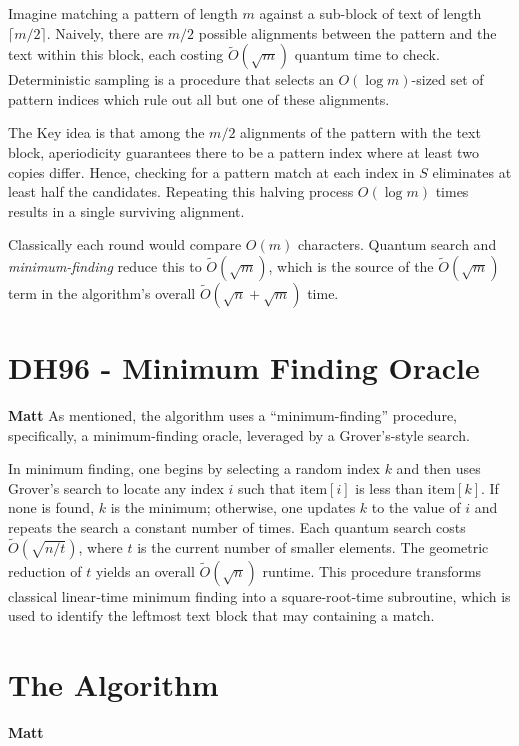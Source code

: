 \documentclass[11pt]{article}
\begin{document}
Imagine matching a pattern of length \(m\) against a sub-block of text of length \(\lceil m/2\rceil\). Naively, there are \(m/2\) possible alignments between the pattern and the text within this block, each costing \(\widetilde{O}(\sqrt{m})\) quantum time to check. Deterministic sampling is a procedure that selects an \(O(\log m)\)-sized set of pattern indices which rule out all but one of these alignments.

The Key idea is that among the \(m/2\) alignments of the pattern with the text block, aperiodicity guarantees there to be a pattern index where at least two copies differ. Hence, checking for a pattern match at each index in \(S\) eliminates at least half the candidates. Repeating this halving process \(O(\log m)\) times results in a single surviving alignment.

Classically each round would compare \(O(m)\) characters. Quantum search and \textit{minimum-finding} reduce this to \(\widetilde O(\sqrt{m})\), which is the source of the \(\widetilde O(\sqrt{m})\) term in the algorithm's overall \(\widetilde O(\sqrt{n} + \sqrt{m})\) time.


\section*{DH96 - Minimum Finding Oracle}
\textbf{Matt}\linebreak
As mentioned, the algorithm uses a ``minimum-finding'' procedure, specifically, a minimum-finding oracle, leveraged by a Grover's-style search.

In minimum finding, one begins by selecting a random index \(k\) and then uses Grover’s search to locate any index \(i\) such that \(\text{item}[i]\) is less than \(\text{item}[k]\). If none is found, \(k\) is the minimum; otherwise, one updates \(k\) to the value of \(i\) and repeats the search a constant number of times. Each quantum search costs \(\widetilde{O}(\sqrt{n/t})\), where \(t\) is the current number of smaller elements. The geometric reduction of \(t\) yields an overall \(\widetilde{O}(\sqrt{n})\) runtime. This procedure transforms classical linear‐time minimum finding into a square‐root‐time subroutine, which is used to identify the leftmost text block that may containing a match.

\section*{The Algorithm}
\textbf{Matt} \linebreak
\end{document}
